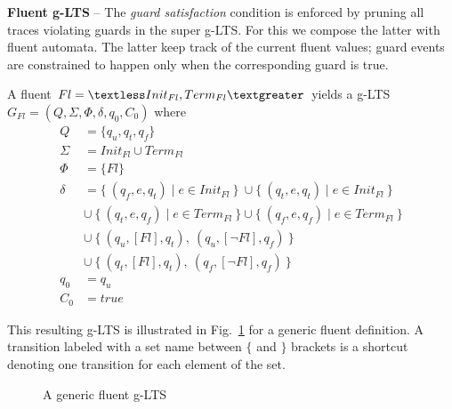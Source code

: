 \noindent \textbf{Fluent g-LTS} -- The \emph{guard satisfaction} condition is enforced by pruning all traces violating guards in the super g-LTS. For this we compose the latter with fluent automata. The latter keep track of the current fluent values; guard events are constrained to happen only when the corresponding guard is true.

A fluent $Fl = \textless Init_{Fl}, Term_{Fl} \textgreater $ yields a g-LTS $G_{Fl} = (Q,\Sigma,\Phi,\delta,q_{0},C_{0})$ where
\begin{align*}
Q      &= \{q_u,q_t,q_f\}            \\
\Sigma &= Init_{Fl} \cup Term_{Fl}   \\
\Phi   &= \{ Fl \} \\
\delta &=    \{~(q_f,e,q_t) \mid e \in Init_{Fl}~\}~\cup \{~(q_t,e,q_t) \mid e \in Init_{Fl}~\} \\
       &\cup~\{~(q_t,e,q_f) \mid e \in Term_{Fl}~\} \cup \{~(q_f,e,q_f) \mid e \in Term_{Fl}~\} \\
       &\cup~\{~(q_u, [Fl], q_t),~(q_u, [\neg Fl], q_f)~\} \\
       &\cup~\{~(q_t, [Fl], q_t),~(q_f, [\neg Fl], q_f)~\} \\
q_0    &= q_u \\
C_0    &= true
\end{align*}

This resulting g-LTS is illustrated in Fig.~\ref{image:fluent-glts} for a generic fluent definition. A transition labeled with a set name between $\{$ and $\}$ brackets is a shortcut denoting one transition for each element of the set.

\begin{figure}[H]\centering
{}
\caption{A generic fluent g-LTS\label{image:fluent-glts}}
\end{figure}

